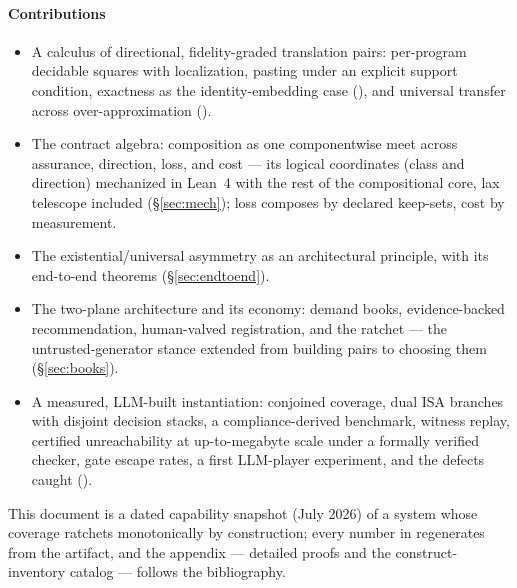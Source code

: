 \paragraph{Contributions}
\begin{itemize}
\item A calculus of directional, fidelity-graded translation pairs:
  per-program decidable squares with localization, pasting under an
  explicit support condition, exactness as the identity-embedding case
  (), and universal transfer across
  over-approximation ().
\item The contract algebra: composition as one componentwise meet
  across assurance, direction, loss, and cost --- its logical
  coordinates (class and direction) mechanized in Lean~4 with the
  rest of the compositional core, lax telescope included
  (\S\ref{sec:mech}); loss composes by declared keep-sets, cost by
  measurement.
\item The existential/universal asymmetry as an architectural
  principle, with its end-to-end theorems (\S\ref{sec:endtoend}).
\item The two-plane architecture and its economy: demand books,
  evidence-backed recommendation, human-valved registration, and the
  ratchet --- the untrusted-generator stance extended from building
  pairs to choosing them (\S\ref{sec:books}).
\item A measured, LLM-built instantiation: conjoined coverage, dual
  ISA branches with disjoint decision stacks, a compliance-derived
  benchmark, witness replay, certified unreachability at up-to-megabyte
  scale under a formally verified checker, gate escape rates, a first
  LLM-player experiment, and the defects caught
  ().
\end{itemize}

This document is a dated capability snapshot (July 2026) of a system
whose coverage ratchets monotonically by construction; every number in
 regenerates from the artifact, and the appendix
--- detailed proofs and the construct-inventory catalog --- follows the
bibliography.

